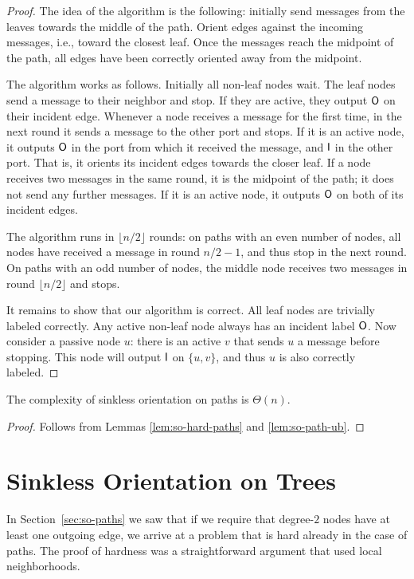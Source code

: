 \begin{proof}
	The idea of the algorithm is the following: initially send messages from the leaves towards the middle of the path. Orient edges against the incoming messages, i.e., toward the closest leaf. Once the messages reach the midpoint of the path, all edges have been correctly oriented away from the midpoint.

	The algorithm works as follows. Initially all non-leaf nodes wait. The leaf nodes send a message to their neighbor and stop. If they are active, they output $\mathsf{O}$ on their incident edge. 
	Whenever a node receives a message for the first time, in the next round it sends a message to the other port and stops. If it is an active node, it outputs $\mathsf{O}$ in the port from which it received the message, and $\mathsf{I}$ in the other port. That is, it orients its incident edges towards the closer leaf. If a node receives two messages in the same round, it is the midpoint of the path; it does not send any further messages. If it is an active node, it outputs $\mathsf{O}$ on both of its incident edges.

	The algorithm runs in $\lfloor n/2 \rfloor$ rounds: on paths with an even number of nodes, all nodes have received a message in round $n/2 - 1$, and thus stop in the next round. On paths with an odd number of nodes, the middle node receives two messages in round $\lfloor n/2 \rfloor$ and stops.

	It remains to show that our algorithm is correct. All leaf nodes are trivially labeled correctly. Any active non-leaf node always has an incident label $\mathsf{O}$. Now consider a passive node $u$: there is an active $v$ that sends $u$ a message before stopping. This node will output $\mathsf{I}$ on $\{u,v\}$, and thus $u$ is also correctly labeled.
\end{proof}

\begin{theorem}
	The complexity of sinkless orientation on paths is $\Theta(n)$.
\end{theorem}

\begin{proof}
	Follows from Lemmas \ref{lem:so-hard-paths} and \ref{lem:so-path-ub}.
\end{proof}

\section{Sinkless Orientation on Trees}

In Section~\ref{sec:so-paths} we saw that if we require that degree-$2$ nodes have at least one outgoing edge, we arrive at a problem that is hard already in the case of paths. The proof of hardness was a straightforward argument that used local neighborhoods.

